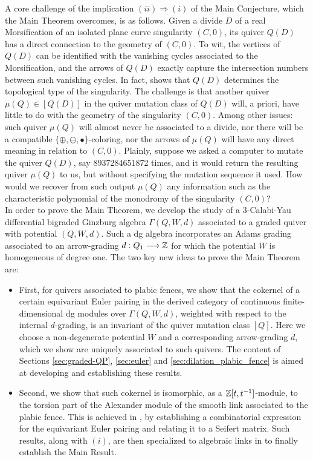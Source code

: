 A core challenge of the implication $(ii)\Longrightarrow (i)$ of the Main Conjecture, which the Main Theorem overcomes, is as follows. Given a divide $D$ of a real Morsification of an isolated plane curve singularity $(C,0)$, its quiver $Q(D)$ has a direct connection to the geometry of $(C,0)$. To wit, the vertices of $Q(D)$ can be identified with the vanishing cycles associated to the Morsification, and the arrows of $Q(D)$ exactly capture the intersection numbers between such vanishing cycles. In fact, \cite[Theorem 4.4]{FPST} shows that $Q(D)$ determines the topological type of the singularity. The challenge is that another quiver $\mu(Q)\in[Q(D)]$ in the quiver mutation class of $Q(D)$ will, a priori, have little to do with the geometry of the singularity $(C,0)$. Among other issues: such quiver $\mu(Q)$ will almost never be associated to a divide, nor there will be a compatible $\{\oplus,\ominus,\bullet\}$-coloring, nor the arrows of $\mu(Q)$ will have any direct meaning in relation to $(C,0)$. Plainly, suppose we asked a computer to mutate the quiver $Q(D)$, say 8937284651872 times, and it would return the resulting quiver $\mu(Q)$ to us, but without specifying the mutation sequence it used. How would we recover from such output $\mu(Q)$ any information such as the characteristic polynomial of the monodromy of the singularity $(C,0)$?\\

In order to prove the Main Theorem, we develop the study of a 3-Calabi-Yau differential bigraded Ginzburg algebra $\Gamma(Q,W,d)$ associated to a graded quiver with potential $(Q,W,d)$. Such a dg algebra incorporates an Adams grading associated to an arrow-grading $d:Q_1\longrightarrow\mathbb Z$ for which the potential $W$ is homogeneous of degree one. The two key new ideas to prove the Main Theorem are:
\begin{itemize}
\item[$(i)$] First, for quivers associated to plabic fences, we show that the cokernel of a certain equivariant Euler pairing in the derived category of continuous finite-dimensional dg modules over $\Gamma(Q,W,d)$, weighted with respect to the internal $d$-grading, is an invariant of the quiver mutation class $[Q]$. Here we choose a non-degenerate potential $W$ and a corresponding arrow-grading $d$, which we show are uniquely associated to such quivers. The content of Sections \ref{sec:graded-QP}, \ref{sec:euler} and \ref{sec:dilation_plabic_fence} is aimed at developing and establishing these results.\\

\item[$(ii)$] Second, we show that such cokernel is isomorphic, as a $\mathbb Z[t,t^{-1}]$-module, to the torsion part of the Alexander module of the smooth link associated to the plabic fence. This is achieved in , by establishing a combinatorial expression for the equivariant Euler pairing and relating it to a Seifert matrix. Such results, along with $(i)$, are then specialized to algebraic links in  to finally establish the Main Result.
\end{itemize}

